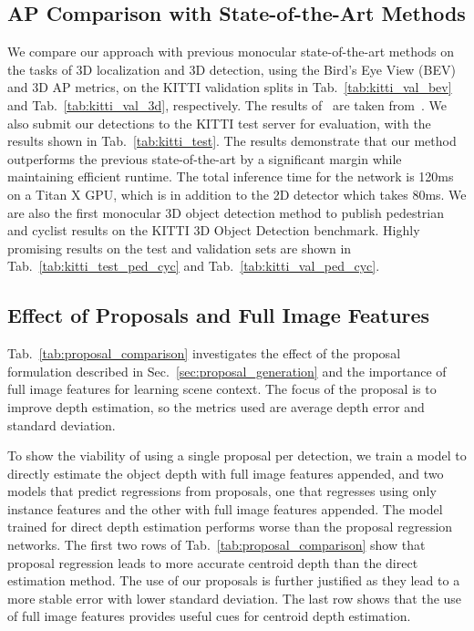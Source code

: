 \documentclass[10pt,twocolumn,letterpaper]{article}
\begin{document}
	\subsection{AP Comparison with State-of-the-Art Methods}
	We compare our approach with previous monocular state-of-the-art methods on the tasks of 3D localization and 3D detection, using the Bird's Eye View (BEV) and 3D AP metrics, on the KITTI validation splits in Tab.~\ref{tab:kitti_val_bev} and Tab.~\ref{tab:kitti_val_3d}, respectively. The results of~\cite{chen_mono3d, mousavian_deep3dbox} are taken from~\cite{xu_multifusion}. We also submit our detections to the KITTI test server for evaluation, with the results shown in Tab.~\ref{tab:kitti_test}. The results demonstrate that our method outperforms the previous state-of-the-art by a significant margin while maintaining efficient runtime. The total inference time for the network is 120ms on a Titan X GPU, which is in addition to the 2D detector which takes 80ms. We are also the first monocular 3D object detection method to publish pedestrian and cyclist results on the KITTI 3D Object Detection benchmark. Highly promising results on the test and validation sets are shown in Tab.~\ref{tab:kitti_test_ped_cyc} and Tab.~\ref{tab:kitti_val_ped_cyc}.
	
	\subsection{Effect of Proposals and Full Image Features} \label{sec:proposal_comparison}
	Tab.~\ref{tab:proposal_comparison} investigates the effect of the proposal formulation described in Sec.~\ref{sec:proposal_generation} and the importance of full image features for learning scene context. The focus of the proposal is to improve depth estimation, so the metrics used are average depth error and standard deviation.
	
	To show the viability of using a single proposal per detection, we train a model to directly estimate the object depth with full image features appended, and two models that predict regressions from proposals, one that regresses using only instance features and the other with full image features appended. The model trained for direct depth estimation performs worse than the proposal regression networks. The first two rows of Tab.~\ref{tab:proposal_comparison} show that proposal regression leads to more accurate centroid depth than the direct estimation method. The use of our proposals is further justified as they lead to a more stable error with lower standard deviation. The last row shows that the use of full image features provides useful cues for centroid depth estimation.
\end{document}
